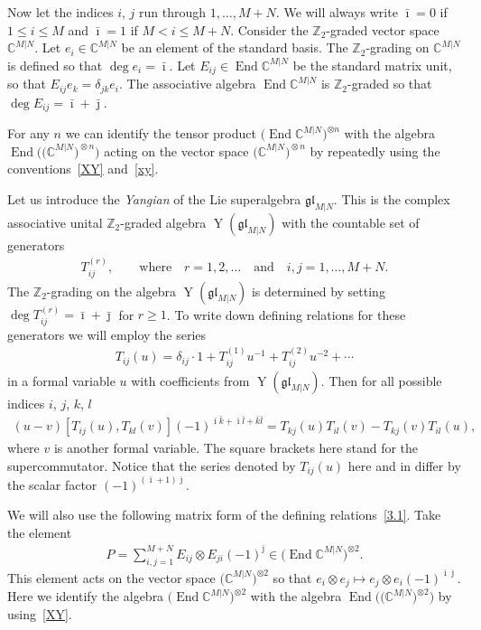 \documentclass[pdftex]{sigma}
\numberwithin{equation}{section}
\def\bi{{\bar\imath }}
\def\bj{{\bar\jmath }}
\def\bk{{\bar k }}
\def\bl{{\bar l }}
\def\CC{{\mathbb{C}}}
\def\CMN{\CC^{M|N}}
\def\de{\delta}
\def\End{\operatorname{End}}
\def\ge{\geqslant}
\def\glMN{\mathfrak{gl}_{M|N}}
\def\le{\leqslant}
\def\ot{\otimes}
\def\YMN{\operatorname{Y}(\glMN)}
\def\ZZ{\mathbb{Z}}
\begin{document}
Now let the indices $i$, $j$ run through $1,\dots, M+N $.
We will always write $\bi=0$ if $1\le i\le M$ and
$\bi=1$ if $M<i\le M+N $. Consider the
$\ZZ_{2}$-graded vector space $\CMN $.
Let $e_i\in\CMN$ be an element of the standard basis.
The $\ZZ_{2}$-grading on $\CMN$ is defined so that $\deg e_i=\bi $.
Let $E_{ij}\in\End\CMN$ be the standard matrix unit, so that
$E_{ij} e_k=\de_{jk} e_i $. The
associative algebra $\End\CMN$
is $\ZZ_{2}$-graded so that $\deg E_{ij}=\bi+ \bj $.

For any $n$ we can identify
the tensor product $\big(\!\End\CMN\big)^{\ot n}$ with the algebra
$\End\!\big(\big(\CMN\big)^{\!\ot n}\big)$ acting on the vector space $\big(\CMN\big)^{\!\ot n}$
by repeatedly using the conventions~\eqref{XY} and~\eqref{xy}.

Let us introduce the {\it Yangian} of the Lie superalgebra
$\glMN$. This is the complex associative
unital $\ZZ_{2}$-graded algebra $\YMN$ with the countable set of generators
\begin{gather}\label{Tijr}
T^{(r)}_{ij},
\qquad\text{where}\quad r=1,2, \dots \quad\text{and}\quad i ,j=1,\dots, M+N .
\end{gather}
The $\ZZ_{2}$-grading on the algebra $\YMN$
is determined by setting $\deg T_{ij}^{(r)}=\bi+\bj$ for $r\ge1$.
To write down defining relations for these
generators we will employ the series
\begin{gather}\label{3.0}
T_{ij}(u)=\de_{ij}\cdot1+T_{ij}^{(1)} u^{-1}+T_{ij}^{(2)} u^{-2}+\cdots
\end{gather}
in a formal variable $u$ with coefficients from $\YMN $.
Then for all possible indices $i$, $j$, $k$, $l${\samepage
\begin{gather}\label{3.1}
(u-v)[ T_{ij}(u) ,T_{kl}(v) ](-1)^{\bi \bk + \bi \bl + \bk \bl}=T_{kj}(u) T_{il}(v)-T_{kj}(v) T_{il}(u),
\end{gather}
where $v$ is another formal variable.
The square brackets here stand for the supercommutator.
Notice that the series denoted by $T_{ij}(u)$
here and in \cite{N1} differ by the scalar factor
$(-1)^{( \bi+1 ) \bj}$.}

We will also use the following matrix form of the defining relations~\eqref{3.1}.
Take the element
\begin{gather}\label{pop}
P = \sum_{i,j=1}^{M+N} E_{ij}\ot E_{ji} (-1)^{\bj}
\in\big(\End\CMN\big)^{\ot 2} .
\end{gather}
This element acts on the vector space $\big(\CMN\big)^{\ot 2}$ so that
$e_i\ot e_{j}\mapsto e_j\ot e_i {(-1)}^{\bi \bj}$.
Here we identify the algebra $\big(\End\CMN\big)^{\ot 2}$ with the algebra
$\End\big(\big(\CMN\big)^{\ot 2}\big)$ by using~\eqref{XY}.
\end{document}
